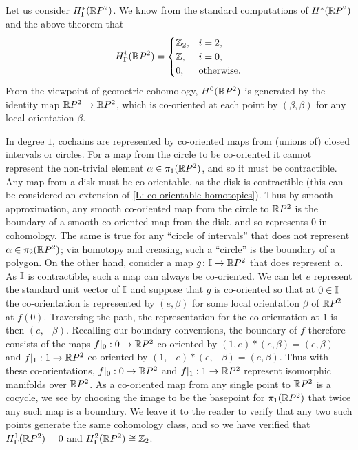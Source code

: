 \begin{example}
	Let us consider $H^*_\Gamma(\mathbb{R} P^2)$.
	We know from the standard computations of $H^*(\mathbb{R} P^2)$ and the above theorem that
	\begin{equation*}
		H_\Gamma^i(\mathbb{R} P^2) =
		\begin{cases}
			\mathbb{Z}_2,&i = 2,\\
			\mathbb{Z},&i = 0,\\
			0,&\text{otherwise.}
		\end{cases}
	\end{equation*}
	From the viewpoint of geometric cohomology, $H^0(\mathbb{R} P^2)$ is generated by the identity map $\mathbb{R} P^2 \to \mathbb{R} P^2$, which is co-oriented at each point by $(\beta,\beta)$ for any local orientation $\beta$.

	In degree $1$, cochains are represented by co-oriented maps from (unions of) closed intervals or circles.
	For a map from the circle to be co-oriented it cannot represent the non-trivial element $\alpha \in \pi_1(\mathbb{R} P^2)$, and so it must be contractible.
	Any map from a disk must be co-orientable, as the disk is contractible (this can be considered an extension of \cref{L: co-orientable homotopies}).
	Thus by smooth approximation, any smooth co-oriented map from the circle to $\mathbb{R} P^2$ is the boundary of a smooth co-oriented map from the disk, and so represents $0$ in cohomology.
	The same is true for any ``circle of intervals'' that does not represent $\alpha \in \pi_2(\mathbb{R} P^2)$; via homotopy and creasing, such a ``circle'' is the boundary of a polygon.
	On the other hand, consider a map $g \colon \mathbb{I} \to \mathbb{R} P^2$ that does represent $\alpha$.
	As $\mathbb{I}$ is contractible, such a map can always be co-oriented.
	We can let $e$ represent the standard unit vector of $\mathbb{I}$ and suppose that $g$ is co-oriented so that at $0 \in \mathbb{I}$ the co-orientation is represented by $(e,\beta)$ for some local orientation $\beta$ of $\mathbb{R} P^2$ at $f(0)$.
	Traversing the path, the representation for the co-orientation at $1$ is then $(e,-\beta)$.
	Recalling our boundary conventions, the boundary of $f$ therefore consists of the maps $f|_0:0 \to \mathbb{R} P^2$ co-oriented by $(1,e)*(e,\beta) = (e,\beta)$ and $f|_1:1 \to \mathbb{R} P^2$ co-oriented by $(1,-e)*(e,-\beta) = (e,\beta)$.
	Thus with these co-orientations, $f|_0:0 \to \mathbb{R} P^2$ and $f|_1:1 \to \mathbb{R} P^2$ represent isomorphic manifolds over $\mathbb{R} P^2$.
	As a co-oriented map from any single point to $\mathbb{R} P^2$ is a cocycle, we see by choosing the image to be the basepoint for $\pi_1(\mathbb{R} P^2)$ that twice any such map is a boundary.
	We leave it to the reader to verify that any two such points generate the same cohomology class, and so we have verified that $H^1_\Gamma(\mathbb{R} P^2) = 0$ and $H_\Gamma^2(\mathbb{R} P^2) \cong \mathbb{Z}_2$.
\end{example}

